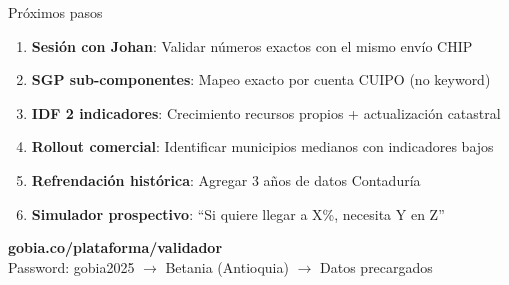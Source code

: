 \documentclass[aspectratio=169,11pt]{beamer}
\begin{document}
\begin{frame}{Pr\'oximos pasos}
\begin{enumerate}
    \item \textbf{Sesi\'on con Johan}: Validar n\'umeros exactos con el mismo env\'io CHIP
    \item \textbf{SGP sub-componentes}: Mapeo exacto por cuenta CUIPO (no keyword)
    \item \textbf{IDF 2 indicadores}: Crecimiento recursos propios + actualizaci\'on catastral
    \item \textbf{Rollout comercial}: Identificar municipios medianos con indicadores bajos
    \item \textbf{Refrendaci\'on hist\'orica}: Agregar 3 a\~nos de datos Contadur\'ia
    \item \textbf{Simulador prospectivo}: ``Si quiere llegar a X\%, necesita Y en Z''
\end{enumerate}

\vspace{12pt}
\centering
\textcolor{ochre}{\large\textbf{gobia.co/plataforma/validador}}\\[4pt]
\textcolor{sepia}{\small Password: gobia2025 $\to$ Betania (Antioquia) $\to$ Datos precargados}
\end{frame}
\end{document}
